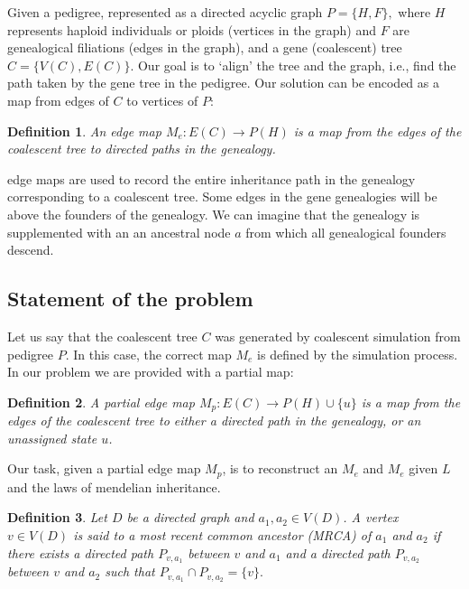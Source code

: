 \documentclass[14pt]{extarticle}
\newtheorem{definition}{Definition}
\begin{document}
Given a pedigree, represented as a directed acyclic graph $P = \{H, F\},$ where $H$ represents haploid individuals or ploids (vertices in the graph) and $F$ are genealogical filiations (edges in the graph), and a gene (coalescent) tree $C = \{V(C), E(C)\}.$ Our goal is to `align' the tree and the graph, i.e., find the path taken by the gene tree in the pedigree. Our solution can be encoded as a map from edges of $C$ to vertices of $P$:



\begin{definition}
An edge map $M_e:E(C) \rightarrow P(H)$ is a map from the edges of the coalescent tree to directed paths in the genealogy.    
\end{definition}

edge maps are used to record the entire inheritance path in the genealogy corresponding to a coalescent tree. Some edges in the gene genealogies will be above the founders of the genealogy. We can imagine that the genealogy is supplemented with an an ancestral node $a$ from which all genealogical founders descend.  



\subsection{Statement of the problem} 

Let us say that the coalescent tree $C$ was generated by coalescent simulation from pedigree $P$. In this case, the correct map $M_e$ is defined by the simulation process. 
In our problem we are provided with a partial map: 

\begin{definition}
A partial edge map $M_p:E(C) \rightarrow P(H) \cup \{u\}$ is a map from the edges of the coalescent tree to either a directed path in the genealogy, or an unassigned state $u$.    
\end{definition}




Our task, given a partial edge map $M_p$, is to reconstruct an $M_e$ and $M_e$ given $L$ and the laws of mendelian inheritance.  

\begin{definition}
	Let $D$ be a directed graph and $a_1, a_2 \in V(D)$. A vertex $v \in V(D)$ is said to a most recent common ancestor (MRCA) of $a_1$ and $a_2$ if there exists 
	a directed path $P_{v,a_1}$ between $v$ and $a_1$ and a directed path $P_{v,a_2}$ between $v$ and $a_2$ such that $P_{v,a_1} \cap P_{v,a_2} = \{v\}.$	
\end{definition}
\end{document}

